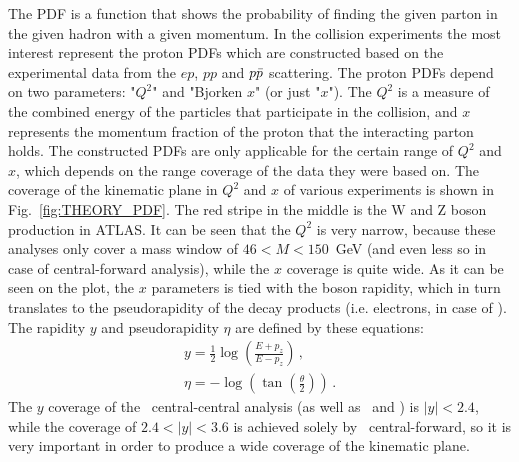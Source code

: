 \begin{figure}
\end{figure}

The PDF is a function that shows the probability of finding the given parton in the given hadron with a given momentum. In the collision experiments the most interest represent the proton PDFs which are constructed based on the experimental data from the $ep$, $pp$ and $p\bar{p}$ scattering. The proton PDFs depend on two parameters: "$Q^{2}$" and "Bjorken $x$" (or just "$x$"). The $Q^{2}$ is a measure of the combined energy of the particles that participate in the collision, and $x$ represents the momentum fraction of the proton that the interacting parton holds. The constructed PDFs are only applicable for the certain range of $Q^{2}$ and $x$, which depends on the range coverage of the data they were based on. The coverage of the kinematic plane in $Q^{2}$ and $x$ of various experiments is shown in Fig.~\ref{fig:THEORY_PDF}. The red stripe in the middle is the W and Z boson production in ATLAS. It can be seen that the $Q^{2}$ is very narrow, because these analyses only cover a mass window of $46 < M < 150$~GeV (and even less so in case of central-forward analysis), while the $x$ coverage is quite wide. As it can be seen on the plot, the $x$ parameters is tied with the boson rapidity, which in turn translates to the pseudorapidity of the decay products (i.e. electrons, in case of \Zee). The rapidity $y$ and pseudorapidity $\eta$ are defined by these equations:
\begin{equation}
\begin{gathered}
y = \frac{1}{2} \log \left(\frac{E+p_z}{E-p_z}\right)\,, \\
\eta = - \log (\tan (\frac{\theta}{2}))\,.
\end{gathered}
\end{equation}
The $y$ coverage of the \Zee\ central-central analysis (as well as \Zmm\ and \Wenu) is $|y| < 2.4$, while the coverage of $2.4 < |y| < 3.6$ is achieved solely by \Zee\ central-forward, so it is very important in order to produce a wide coverage of the kinematic plane.


